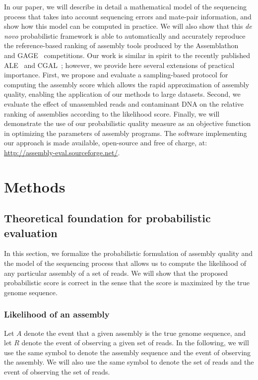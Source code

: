 In our paper, we will describe in detail a mathematical model of the
sequencing process that takes into account sequencing errors and
mate-pair information, and show how this model can be computed in
practice. We will also show that this \emph{de novo} probabilistic framework is able to automatically and accurately reproduce the
reference-based ranking of assembly tools produced by the
Assemblathon~\cite{earl2011assemblathon} and GAGE~\cite{salzberg2011gage}
competitions.
Our work is similar in spirit to the recently published ALE~\cite{clark2013ale} and CGAL~\cite{rahman2013cgal}; however, we provide here several extensions of practical importance.  First, we propose and evaluate a sampling-based protocol for computing the assembly score which allows the rapid approximation of assembly quality, enabling the application of our methods to large datasets.  Second, we evaluate the effect of unassembled reads and contaminant DNA on the relative ranking of assemblies according to the likelihood score.
Finally, we will
demonstrate the use of our probabilistic quality measure as an
objective function in optimizing the parameters of assembly programs.
The software implementing our approach is made available, open-source
and free of charge, at: \url{http://assembly-eval.sourceforge.net/}.


\section{Methods}
\label{theory}

\subsection{Theoretical foundation for probabilistic evaluation}
In this section, we formalize the probabilistic formulation of
assembly quality and the model of the sequencing process that
allows us to compute the likelihood of any particular assembly of a
set of reads.  We will show that the proposed probabilistic score is
correct in the sense that the score is maximized by the true genome
sequence.

\subsubsection{Likelihood of an assembly}
Let $A$ denote the event that a given assembly is the true genome
sequence, and let $R$ denote the event of observing a given set of
reads.  In the following, we will use the same symbol to denote the
assembly sequence and the event of observing the assembly.  We will
also use the same symbol to denote the set of reads and the event of
observing the set of reads.

